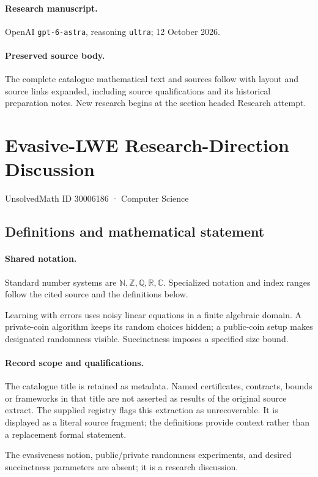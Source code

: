 \documentclass[11pt]{article}
\begin{document}
\paragraph{Research manuscript.} OpenAI \texttt{gpt-6-astra}, reasoning \texttt{ultra}; 12 October 2026.
\paragraph{Preserved source body.} The complete catalogue mathematical text and sources follow with layout and source links expanded, including source qualifications and its historical preparation notes. New research begins at the section headed Research attempt.

\section{Evasive-LWE Research-Direction Discussion}\label{30006186}
{\small UnsolvedMath ID 30006186 · Computer Science}
\subsection{Definitions and mathematical statement}

\paragraph{Shared notation.}Standard number systems are $\mathbb N,\mathbb Z,\mathbb Q,\mathbb R,\mathbb C$. Specialized notation and index ranges follow the cited source and the definitions below.


Learning with errors uses noisy linear equations in a finite algebraic domain. A private-coin algorithm keeps its random choices hidden; a public-coin setup makes designated randomness visible. Succinctness imposes a specified size bound.
\paragraph{Record scope and qualifications.}
The catalogue title is retained as metadata. Named certificates, contracts, bounds or frameworks in that title are not asserted as results of the original source extract.
The supplied registry flags this extraction as unrecoverable. It is displayed as a literal source fragment; the definitions provide context rather than a replacement formal statement.

The evasiveness notion, public/private randomness experiments, and desired succinctness parameters are absent; it is a research discussion.
\end{document}

